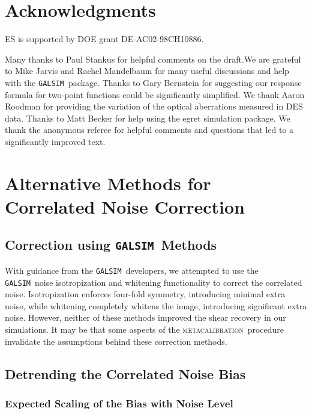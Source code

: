 \documentclass[iop, twocolappendix, appendixfloats, numberedappendix, apj]{emulateapj}
\newcommand{\mcal}{\textsc{metacalibration}}
\newcommand{\galsim}{\texttt{GALSIM}}
\begin{document}
\section*{Acknowledgments}

ES is supported by DOE grant DE-AC02-98CH10886.

Many thanks to Paul Stankus for helpful comments on the draft.We are grateful
to Mike Jarvis and Rachel Mandelbaum for many useful discussions and help with
the \galsim\ package. Thanks to Gary Bernstein for suggesting our response
formula for two-point functions could be significantly simplified.  We thank
Aaron Roodman for providing the variation of the optical aberrations measured
in DES data.  Thanks to Matt Becker for help using the egret simulation
package.  We thank the anonymous referee for helpful comments and questions
that led to a significantly improved text.

\appendix

\section{Alternative Methods for Correlated Noise Correction} \label{sec:altcorr}

\subsection{Correction using \galsim\ Methods}

With guidance from the \galsim\ developers, we attempted to use the \galsim\
noise isotropization and whitening functionality to correct the correlated
noise.  Isotropization enforces four-fold symmetry, introducing minimal extra
noise, while whitening completely whitens the image, introducing significant
extra noise.  However, neither of these methods improved the shear recovery in
our simulations.  It may be that some aspects of the \mcal\ procedure
invalidate the assumptions behind these correction methods.


\subsection{Detrending the Correlated Noise Bias} \label{sec:detrend}

\subsubsection{Expected Scaling of the Bias with Noise Level} \label{sec:scaling}
\end{document}
